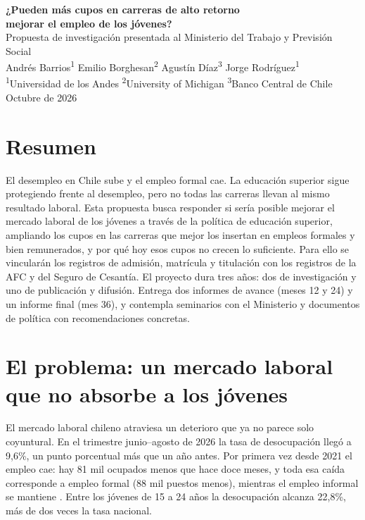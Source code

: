 \documentclass[11pt,a4paper]{article}
\begin{document}
\begin{center}
{\Large\bfseries ¿Pueden más cupos en carreras de alto retorno\\ mejorar el empleo de los jóvenes?}\\[0.6em]
{\large Propuesta de investigación presentada al Ministerio del Trabajo y Previsión Social}\\[1em]
Andrés Barrios\textsuperscript{1} \quad Emilio Borghesan\textsuperscript{2} \quad Agustín Díaz\textsuperscript{3} \quad Jorge Rodríguez\textsuperscript{1}\\[2pt]
{\small\textsuperscript{1}Universidad de los Andes \quad \textsuperscript{2}University of Michigan \quad \textsuperscript{3}Banco Central de Chile}\\[2pt]
{\small Octubre de 2026}
\end{center}

\section*{Resumen}

El desempleo en Chile sube y el empleo formal cae. La educación superior sigue protegiendo frente al desempleo, pero no todas las carreras llevan al mismo resultado laboral. Esta propuesta busca responder si sería posible mejorar el mercado laboral de los jóvenes a través de la política de educación superior, ampliando los cupos en las carreras que mejor los insertan en empleos formales y bien remunerados, y por qué hoy esos cupos no crecen lo suficiente. Para ello se vincularán los registros de admisión, matrícula y titulación con los registros de la AFC y del Seguro de Cesantía. El proyecto dura tres años: dos de investigación y uno de publicación y difusión. Entrega dos informes de avance (meses 12 y 24) y un informe final (mes 36), y contempla seminarios con el Ministerio y documentos de política con recomendaciones concretas.

\section{El problema: un mercado laboral que no absorbe a los jóvenes}

El mercado laboral chileno atraviesa un deterioro que ya no parece solo coyuntural. En el trimestre junio--agosto de 2026 la tasa de desocupación llegó a 9,6\%, un punto porcentual más que un año antes. Por primera vez desde 2021 el empleo cae: hay 81 mil ocupados menos que hace doce meses, y toda esa caída corresponde a empleo formal (88 mil puestos menos), mientras el empleo informal se mantiene \citep{ine2026b}. Entre los jóvenes de 15 a 24 años la desocupación alcanza 22,8\%, más de dos veces la tasa nacional.
\end{document}
